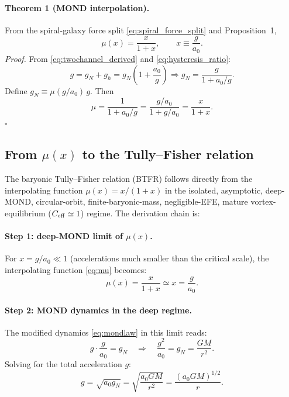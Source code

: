 \documentclass[11pt]{article}
\begin{document}
\paragraph{Theorem 1 (MOND interpolation).}
From the spiral-galaxy force split \eqref{eq:spiral_force_split} and
Proposition~1,
\begin{equation}
\mu(x)=\frac{x}{1+x},
\qquad
x\equiv\frac{g}{a_0}.
\label{eq:mu}
\end{equation}
\textit{Proof.}
From \eqref{eq:twochannel_derived} and \eqref{eq:hysteresis_ratio}:
\begin{equation}
g=g_N+g_h
=g_N\!\left(1+\frac{a_0}{g}\right)
\Rightarrow
g_N=\frac{g}{1+a_0/g}.
\label{eq:mu_def}
\end{equation}
Define $g_N\equiv\mu(g/a_0)\,g$. Then
\[
\mu=\frac{1}{1+a_0/g}=\frac{g/a_0}{1+g/a_0}
=\frac{x}{1+x}.
\]
\hfill$\square$

\subsection[From mu(x) to the Tully-Fisher relation]{From $\mu(x)$ to the Tully--Fisher relation}

The baryonic Tully--Fisher relation (BTFR) follows directly from the interpolating function $\mu(x)=x/(1+x)$ in the isolated, asymptotic, deep-MOND, circular-orbit, finite-baryonic-mass, negligible-EFE, mature vortex-equilibrium ($C_{\rm eff}\simeq 1$) regime. The derivation chain is:

\paragraph{Step 1: deep-MOND limit of $\mu(x)$.}
For $x = g/a_0 \ll 1$ (accelerations much smaller than the critical scale), the interpolating function \eqref{eq:mu} becomes:
\begin{equation}
\mu(x) = \frac{x}{1+x} \simeq x = \frac{g}{a_0}.
\label{eq:mu_deep}
\end{equation}

\paragraph{Step 2: MOND dynamics in the deep regime.}
The modified dynamics \eqref{eq:mondlaw} in this limit reads:
\begin{equation}
g \cdot \frac{g}{a_0} = g_N \quad\Rightarrow\quad \frac{g^2}{a_0} = g_N = \frac{GM}{r^2}.
\label{eq:deep_mond}
\end{equation}
Solving for the total acceleration $g$:
\begin{equation}
g = \sqrt{a_0 g_N} = \sqrt{\frac{a_0 GM}{r^2}} = \frac{(a_0 GM)^{1/2}}{r}.
\label{eq:g_deep}
\end{equation}
\end{document}
